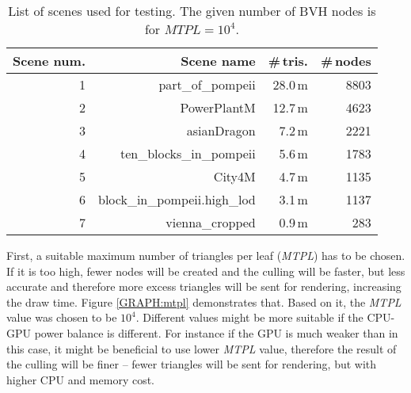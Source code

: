 \documentclass[report,11pt]{elsarticle}
\begin{document}
\begin{table*}[t]
\begin{center}
\begin{tabular}{| r | r | r | r |}
	\hline
	Scene num. 	& Scene name & \#\,tris. & \#\,nodes \\
	\hline
	\hline
	1						& part\_of\_pompeii 						& 28.0\,m	& 8803 \\
	\hline
	2						& PowerPlantM										& 12.7\,m & 4623 \\
	\hline
	3 					& asianDragon										& 7.2\,m 	& 2221 \\
	\hline
	4        		& ten\_blocks\_in\_pompeii  		& 5.6\,m 	& 1783 \\
	\hline
	5						& City4M												& 4.7\,m	& 1135 \\
	\hline
	6						& block\_in\_pompeii.high\_lod 	& 3.1\,m 	& 1137 \\
	\hline
	7						& vienna\_cropped								& 0.9\,m	& 283 \\
	\hline
\end{tabular}
\end{center}
	\caption{List of scenes used for testing. The given number of BVH nodes is for $MTPL=10^{4}$.}
	\label{TAB:scenes}
\end{table*}

First, a suitable maximum number of triangles per leaf (\emph{MTPL}) has to be chosen. If it is too high, fewer nodes will be created and the culling will be faster, but less accurate and therefore more excess triangles will be sent for rendering, increasing the draw time. Figure \ref{GRAPH:mtpl} demonstrates that. Based on it, the \emph{MTPL} value was chosen to be $10^{4}$. Different values might be more suitable if the CPU-GPU power balance is different. For instance if the GPU is much weaker than in this case, it might be beneficial to use lower \emph{MTPL} value, therefore the result of the culling will be finer -- fewer triangles will be sent for rendering, but with higher CPU and memory cost.
\end{document}
